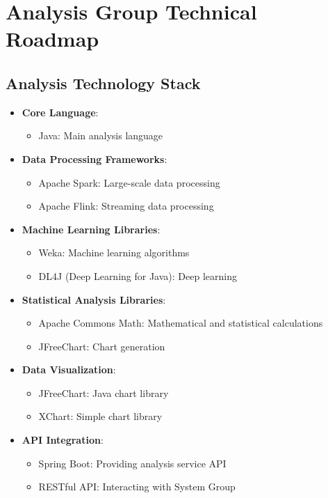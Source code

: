 \documentclass[a4paper,12pt]{article}
\begin{document}
\section{Analysis Group Technical Roadmap}

\subsection{Analysis Technology Stack}

\begin{itemize}
  \item \textbf{Core Language}:
    \begin{itemize}
      \item Java: Main analysis language
    \end{itemize}
  
  \item \textbf{Data Processing Frameworks}:
    \begin{itemize}
      \item Apache Spark: Large-scale data processing
      \item Apache Flink: Streaming data processing
    \end{itemize}
  
  \item \textbf{Machine Learning Libraries}:
    \begin{itemize}
      \item Weka: Machine learning algorithms
      \item DL4J (Deep Learning for Java): Deep learning
    \end{itemize}
  
  \item \textbf{Statistical Analysis Libraries}:
    \begin{itemize}
      \item Apache Commons Math: Mathematical and statistical calculations
      \item JFreeChart: Chart generation
    \end{itemize}
  
  \item \textbf{Data Visualization}:
    \begin{itemize}
      \item JFreeChart: Java chart library
      \item XChart: Simple chart library
    \end{itemize}
  
  \item \textbf{API Integration}:
    \begin{itemize}
      \item Spring Boot: Providing analysis service API
      \item RESTful API: Interacting with System Group
    \end{itemize}
\end{itemize}
\end{document}
